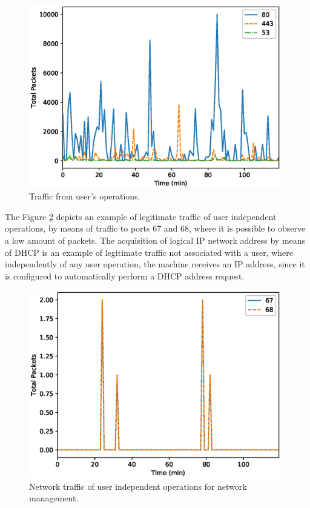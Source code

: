 \begin{figure}[h!]
     \centering 
     \includegraphics[width=11cm]{figures/ch2/user_traffic.eps}
     \caption{Traffic from user's operations.}
     \label{fig:2.03}
\end{figure}

The Figure \ref{fig:2.04} depicts an example of legitimate traffic of user independent operations, by means of traffic to ports 67 and 68, where it is possible to observe a low amount of packets. The acquisition of logical IP network address by means of DHCP is an example of legitimate traffic not associated with a user, where independently of any user operation, the machine receives an IP address, since it is configured to automatically perform a DHCP address request. 

\begin{figure}[h!]
     \centering 
     \includegraphics[width=11cm]{figures/ch2/auto_traffic.eps}
     \caption{Network traffic of user independent operations for network management.}
     \label{fig:2.04}
\end{figure}

